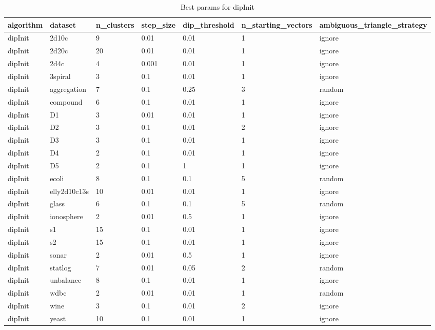 \begin{table}[H]
\centering
\caption{Best params for dipInit}
\label{S18_Table}
\begin{tabular}{|l|l|l|l|l|l|l|}
\hline
algorithm & dataset & n\_clusters & step\_size & dip\_threshold & n\_starting\_vectors & ambiguous\_triangle\_strategy \\
\hline
dipInit & 2d10c & 9 & 0.01 & 0.01 & 1 & ignore \\
\hline
dipInit & 2d20c & 20 & 0.01 & 0.01 & 1 & ignore \\
\hline
dipInit & 2d4c & 4 & 0.001 & 0.01 & 1 & ignore \\
\hline
dipInit & 3spiral & 3 & 0.1 & 0.01 & 1 & ignore \\
\hline
dipInit & aggregation & 7 & 0.1 & 0.25 & 3 & random \\
\hline
dipInit & compound & 6 & 0.1 & 0.01 & 1 & ignore \\
\hline
dipInit & D1 & 3 & 0.01 & 0.01 & 1 & ignore \\
\hline
dipInit & D2 & 3 & 0.1 & 0.01 & 2 & ignore \\
\hline
dipInit & D3 & 3 & 0.1 & 0.01 & 1 & ignore \\
\hline
dipInit & D4 & 2 & 0.1 & 0.01 & 1 & ignore \\
\hline
dipInit & D5 & 2 & 0.1 & 1 & 1 & ignore \\
\hline
dipInit & ecoli & 8 & 0.1 & 0.1 & 5 & random \\
\hline
dipInit & elly2d10c13s & 10 & 0.01 & 0.01 & 1 & ignore \\
\hline
dipInit & glass & 6 & 0.1 & 0.1 & 5 & random \\
\hline
dipInit & ionosphere & 2 & 0.01 & 0.5 & 1 & ignore \\
\hline
dipInit & s1 & 15 & 0.1 & 0.01 & 1 & ignore \\
\hline
dipInit & s2 & 15 & 0.1 & 0.01 & 1 & ignore \\
\hline
dipInit & sonar & 2 & 0.01 & 0.5 & 1 & ignore \\
\hline
dipInit & statlog & 7 & 0.01 & 0.05 & 2 & random \\
\hline
dipInit & unbalance & 8 & 0.1 & 0.01 & 1 & ignore \\
\hline
dipInit & wdbc & 2 & 0.01 & 0.01 & 1 & random \\
\hline
dipInit & wine & 3 & 0.1 & 0.01 & 2 & ignore \\
\hline
dipInit & yeast & 10 & 0.1 & 0.01 & 1 & ignore \\
\hline
\end{tabular}
\end{table}

